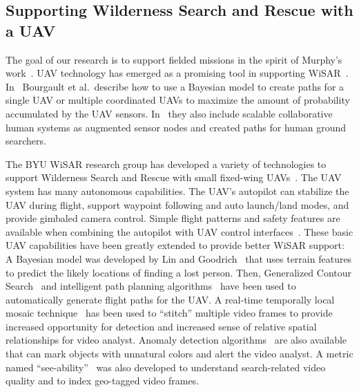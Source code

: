 \subsection{Supporting Wilderness Search and Rescue with a UAV}

The goal of our research is to support fielded missions in the spirit of Murphy's work~\cite{Casper2003Human}. UAV technology has emerged as a promising tool in supporting WiSAR~\cite{Murphy2008Cooperative,Bourgault2003Coordinated}. In~\cite{Bourgault2006Optimal, Bourgault2004Coordinated} Bourgault et al.\ describe how to use a Bayesian model to create paths for a single UAV or multiple coordinated UAVs to maximize the amount of probability accumulated by the UAV sensors. In~\cite{Bourgault2008Human} they also include scalable collaborative human systems as augmented sensor nodes and created paths for human ground searchers.

The BYU WiSAR research group has developed a variety of technologies to support Wilderness Search and Rescue with small fixed-wing UAVs~\cite{Beard2005Autonomous, Goodrich2008Supporting, Goodrich2009Towards, Lin2010Supporting}. The UAV system has many autonomous capabilities. The UAV's autopilot can stabilize the UAV during flight, support waypoint following and auto launch/land modes, and provide gimbaled camera control. Simple flight patterns and safety features are available when combining the autopilot with UAV control interfaces~\cite{Beard2005Autonomous, Lin2010Supporting}. These basic UAV capabilities have been greatly extended to provide better WiSAR support: A Bayesian model was developed by Lin and Goodrich~\cite{Lin2010Bayesian} that uses terrain features to predict the likely locations of finding a lost person. Then, Generalized Contour Search~\cite{Goodrich2008Supporting} and intelligent path planning algorithms~\cite{Lin2009UAV,Niedfeldt2010integrated} have been used to automatically generate flight paths for the UAV. A real-time temporally local mosaic technique~\cite{Morse2008Application} has been used to ``stitch'' multiple video frames to provide increased opportunity for detection and increased sense of relative spatial relationships for video analyst. Anomaly detection algorithms~\cite{Thornton2011Unusual} are also available that can mark objects with unnatural colors and alert the video analyst. A metric named ``see-ability''~\cite{Morse2010UAV} was also developed to understand search-related video quality and to index geo-tagged video frames. 

